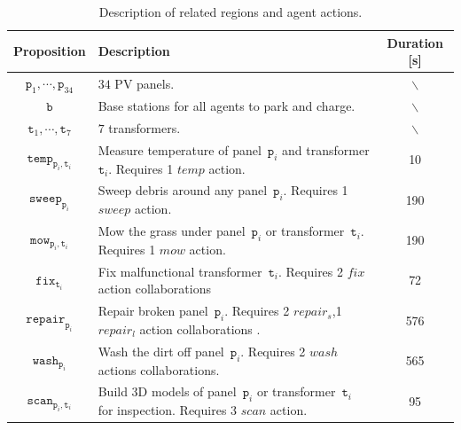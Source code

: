 \begin{table}[t]\footnotesize
 \centering
\caption{Description of related regions and agent actions.}
\label{fig:symbols}
\begin{tabular}{|c|m{}|c|}\hline
\textbf{Proposition} & \textbf{Description}\centering & \textbf{Duration} [s]\\ \hline
$\texttt{p}_1,\cdots,\texttt{p}_{34}$ & $34$ PV panels. & $\backslash$ \\ \hline
$\texttt{b}$ & Base stations for all agents to park and charge. & $\backslash$ \\ \hline
$\texttt{t}_1,\cdots,\texttt{t}_7$ & $7$ transformers. & $\backslash$ \\ \hline
$\texttt{temp}_{\texttt{p}_i,\texttt{t}_i}$ &
Measure temperature of panel~$\texttt{p}_i$ and transformer $\texttt{t}_i$.
Requires 1 $temp$ action. & 10 \\ \hline
$\texttt{sweep}_{\texttt{p}_i}$& Sweep debris around any panel~$\texttt{p}_i$.
Requires 1 $sweep$ action. & 190\\ \hline
$\texttt{mow}_{\texttt{p}_i,\texttt{t}_i}$ &
Mow the grass under panel~$\texttt{p}_i$ or transformer~$\texttt{t}_i$.
Requires 1 $mow$ action. & 190\\ \hline
$\texttt{fix}_{\texttt{t}_i}$ &
Fix malfunctional transformer~$\texttt{t}_i$.
Requires 2 $fix$ action collaborations & 72\\ \hline
$\texttt{repair}_{\texttt{p}_i}$ &
Repair broken panel~$\texttt{p}_i$.
Requires 2 $repair_s$,1 $repair_l$ action collaborations . & 576\\ \hline
$\texttt{wash}_{\texttt{p}_i}$ &
Wash the dirt off panel~$\texttt{p}_i$.
Requires 2 $wash$ actions collaborations. & 565\\ \hline
$\texttt{scan}_{\texttt{p}_i,\texttt{t}_i}$ &
Build 3D models of panel~$\texttt{p}_i$ or transformer~$\texttt{t}_i$
for inspection. Requires 3 $scan$ action. & 95\\ \hline
\end{tabular}
\end{table}

